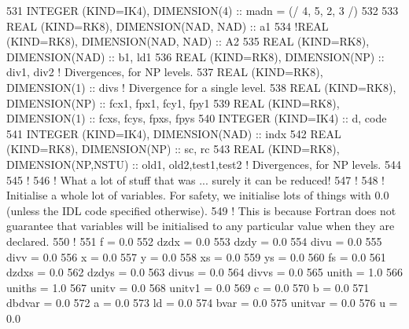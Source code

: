 \begin{DoxyCode}
531 \textcolor{keywordtype}{INTEGER (KIND=IK4)}, \textcolor{keywordtype}{DIMENSION(4)}                    :: madn = (/ 4, 5, 2, 3 /) 
532 
533 \textcolor{keywordtype}{REAL (KIND=RK8)}, \textcolor{keywordtype}{DIMENSION(NAD, NAD)}                :: a1
534 \textcolor{comment}{!REAL (KIND=RK8), DIMENSION(NAD, NAD)                :: A2}
535 \textcolor{keywordtype}{REAL (KIND=RK8)}, \textcolor{keywordtype}{DIMENSION(NAD)}                     :: b1, ld1
536 \textcolor{keywordtype}{REAL (KIND=RK8)}, \textcolor{keywordtype}{DIMENSION(NP)}                      :: div1, div2               \textcolor{comment}{! Divergences, for NP
       levels.}
537 \textcolor{keywordtype}{REAL (KIND=RK8)}, \textcolor{keywordtype}{DIMENSION(1)}                       :: divs                     \textcolor{comment}{! Divergence for a single
       level.}
538 \textcolor{keywordtype}{REAL (KIND=RK8)}, \textcolor{keywordtype}{DIMENSION(NP)}                      :: fcx1, fpx1, fcy1, fpy1
539 \textcolor{keywordtype}{REAL (KIND=RK8)}, \textcolor{keywordtype}{DIMENSION(1)}                       :: fcxs, fcys, fpxs, fpys
540 \textcolor{keywordtype}{INTEGER (KIND=IK4)}                                  :: d, code
541 \textcolor{keywordtype}{INTEGER (KIND=IK4)}, \textcolor{keywordtype}{DIMENSION(NAD)}                  :: indx
542 \textcolor{keywordtype}{REAL (KIND=RK8)}, \textcolor{keywordtype}{DIMENSION(NP)}                      :: sc, rc
543 \textcolor{keywordtype}{REAL (KIND=RK8)}, \textcolor{keywordtype}{DIMENSION(NP,NSTU)}                      :: old1, old2,test1,test2               \textcolor{comment}{!
       Divergences, for NP levels.}
544 
545 \textcolor{comment}{!}
546 \textcolor{comment}{! What a lot of stuff that was ... surely it can be reduced!}
547 \textcolor{comment}{!}
548 \textcolor{comment}{! Initialise a whole lot of variables. For safety, we initialise lots of things with 0.0 (unless the IDL
       code specified otherwise).}
549 \textcolor{comment}{! This is because Fortran does not guarantee that variables will be initialised to any particular value
       when they are declared.}
550 \textcolor{comment}{!}
551 f       = 0.0
552 dzdx    = 0.0   
553 dzdy    = 0.0
554 divu    = 0.0
555 divv    = 0.0
556 x       = 0.0
557 y       = 0.0
558 xs      = 0.0
559 ys      = 0.0
560 fs      = 0.0
561 dzdxs   = 0.0
562 dzdys   = 0.0
563 divus   = 0.0
564 divvs   = 0.0
565 unith   = 1.0
566 uniths  = 1.0
567 unitv   = 0.0
568 unitv1  = 0.0
569 c       = 0.0
570 b       = 0.0
571 dbdvar  = 0.0
572 a       = 0.0
573 ld      = 0.0
574 bvar    = 0.0
575 unitvar = 0.0
576 u       = 0.0

\end{DoxyCode}
